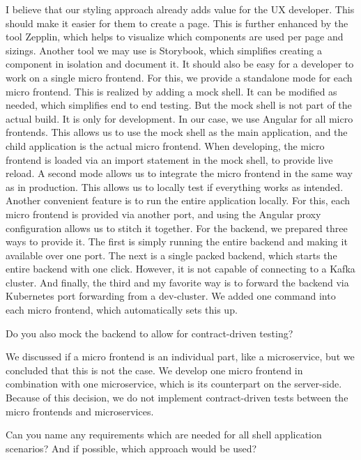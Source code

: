 \begin{description}
    \PirminRehm I believe that our styling approach already adds value for the UX developer. This should make it easier for them to create a page. This is further enhanced by the tool Zepplin, which helps to visualize which components are used per page and sizings.
    Another tool we may use is Storybook, which simplifies creating a component in isolation and document it.
    It should also be easy for a developer to work on a single micro frontend. For this, we provide a standalone mode for each micro frontend. This is realized by adding a mock shell. It can be modified as needed, which simplifies end to end testing. But the mock shell is not part of the actual build. It is only for development. In our case, we use Angular for all micro frontends. This allows us to use the mock shell as the main application, and the child application is the actual micro frontend. When developing, the micro frontend is loaded via an import statement in the mock shell, to provide live reload. A second mode allows us to integrate the micro frontend in the same way as in production. This allows us to locally test if everything works as intended.
    Another convenient feature is to run the entire application locally. For this, each micro frontend is provided via another port, and using the Angular proxy configuration allows us to stitch it together. For the backend, we prepared three ways to provide it.
    The first is simply running the entire backend and making it available over one port. The next is a single packed backend, which starts the entire backend with one click. However, it is not capable of connecting to a Kafka cluster. And finally, the third and my favorite way is to forward the backend via Kubernetes port forwarding from a dev-cluster. We added one command into each micro frontend, which automatically sets this up.

    \NicoVogel Do you also mock the backend to allow for contract-driven testing?

    \PirminRehm We discussed if a micro frontend is an individual part, like a microservice, but we concluded that this is not the case. We develop one micro frontend in combination with one microservice, which is its counterpart on the server-side. Because of this decision, we do not implement contract-driven tests between the micro frontends and microservices.

    \NicoVogel Can you name any requirements which are needed for all shell application scenarios? And if possible, which approach would be used?


\end{description}
